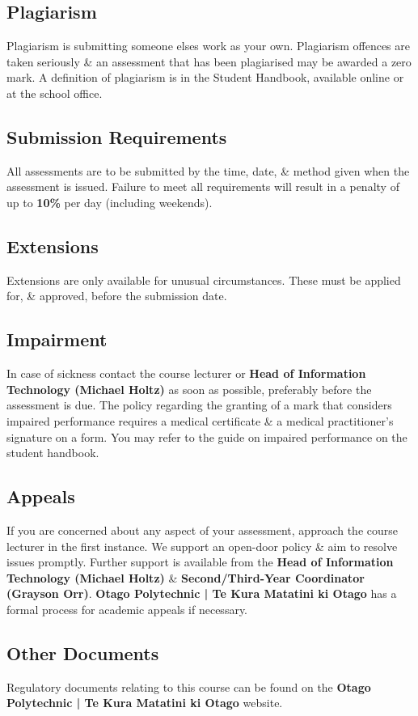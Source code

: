 \documentclass{article}
\begin{document}
\subsection*{Plagiarism}
Plagiarism is submitting someone elses work as your own. Plagiarism offences are taken seriously \& an assessment that has been plagiarised may be awarded a zero mark. A definition of plagiarism is in the Student Handbook, available online or at the school office.

\subsection*{Submission Requirements}
All assessments are to be submitted by the time, date, \& method given when the assessment is issued. Failure to meet all requirements will result in a penalty of up to \textbf{10\%} per day (including weekends).

\subsection*{Extensions}
Extensions are only available for unusual circumstances. These must be applied for, \& approved, before the submission date.

\subsection*{Impairment}
In case of sickness contact the course lecturer or \textbf{Head of Information Technology (Michael Holtz)} as soon as possible, preferably before the assessment is due. The policy regarding the granting of a mark that considers impaired performance requires a medical certificate \& a medical practitioner’s signature on a form. You may refer to the guide on impaired performance on the student handbook.

\subsection*{Appeals}
If you are concerned about any aspect of your assessment, approach the course lecturer in the first instance. We support an open-door policy \& aim to resolve issues promptly. Further support is available from the \textbf{Head of Information Technology (Michael Holtz)} \& \textbf{Second/Third-Year Coordinator (Grayson Orr)}. \textbf{Otago Polytechnic | Te Kura Matatini ki Otago} has a formal process for academic appeals if necessary.

\subsection*{Other Documents}
Regulatory documents relating to this course can be found on the \textbf{Otago Polytechnic | Te Kura Matatini ki Otago} website.
\end{document}

